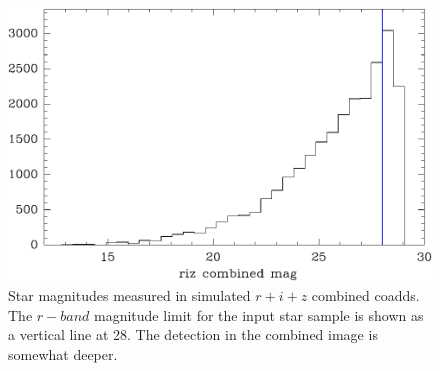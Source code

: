 \documentclass[iop, twocolappendix, appendixfloats, numberedappendix, apj]{hackemulateapj}
\begin{document}
\begin{figure}
    \includegraphics[width=\columnwidth]{mag-hist.pdf}
    \caption{
        Star magnitudes measured in simulated $r+i+z$ combined coadds.  The
        $r-band$ magnitude limit for the input star sample is shown as a
        vertical line at 28.  The detection in the combined image is
        somewhat deeper.
    }
\end{figure}

\end{document}
